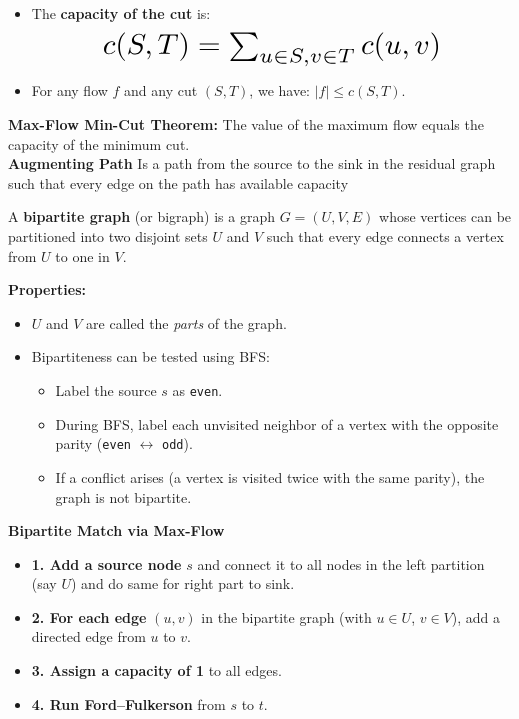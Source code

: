 \documentclass[a4paper,landscape]{article}
\begin{document}
\begin{multicols}{7}
\begin{itemize}[noitemsep, topsep=0pt]
    \item The \textbf{capacity of the cut} is:
    \[
    \resizebox{0.7\textwidth}{!}{$
    c(S, T) = \sum_{u \in S, v \in T} c(u, v)
    $}
    \]
    
    \item For any flow $f$ and any cut $(S, T)$, we have: $|f| \leq c(S, T)$.
\end{itemize}


\textbf{Max-Flow Min-Cut Theorem:} The value of the maximum flow equals the capacity of the minimum cut.\\
\textbf{Augmenting Path}
Is a path from the source to the sink in the residual graph such that every edge on the path has available capacity
\endtcolorbox

\tcolorbox[mybox={Bipartite Graphs}]
A \textbf{bipartite graph} (or bigraph) is a graph $G = (U, V, E)$ whose vertices can be partitioned into two disjoint sets $U$ and $V$ such that every edge connects a vertex from $U$ to one in $V$.

\textbf{Properties:}
\begin{itemize}[noitemsep, topsep=0pt]
    \item $U$ and $V$ are called the \textit{parts} of the graph.
    \item Bipartiteness can be tested using BFS:
    \begin{itemize}[noitemsep, topsep=0pt]
        \item Label the source $s$ as \texttt{even}.
        \item During BFS, label each unvisited neighbor of a vertex with the opposite parity (\texttt{even} $\leftrightarrow$ \texttt{odd}).
        \item If a conflict arises (a vertex is visited twice with the same parity), the graph is not bipartite.
    \end{itemize}
\end{itemize}
 \textbf{Bipartite Match via Max-Flow}
\begin{itemize}
  \item \textbf{1. Add a source node} $s$ and connect it to all nodes in the left partition (say $U$) and do same for right part to sink.
  \item \textbf{2. For each edge} $(u, v)$ in the bipartite graph (with $u \in U$, $v \in V$), add a directed edge from $u$ to $v$.
  \item \textbf{3. Assign a capacity of 1} to all edges.
  \item \textbf{4. Run Ford–Fulkerson} from $s$ to $t$.
\end{itemize}
\endtcolorbox


\end{multicols}
\end{document}
